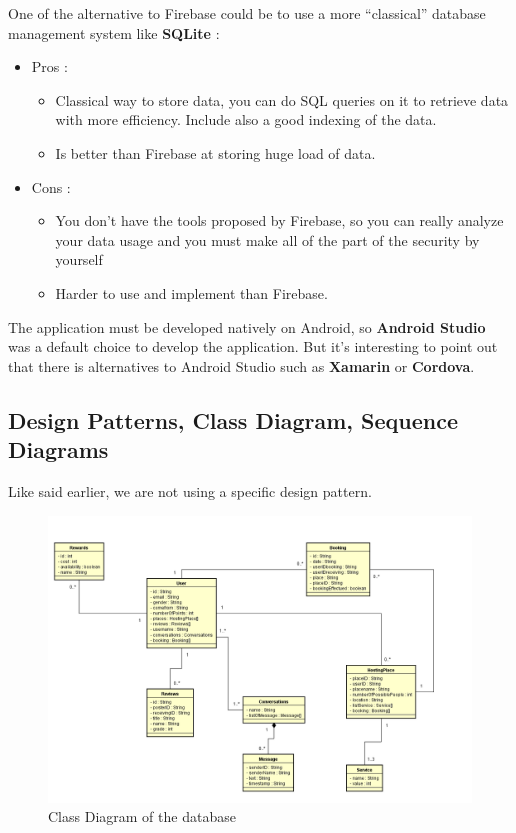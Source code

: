 \documentclass[paper=a4, fontsize=12pt,DIV=14]{scrartcl}    %
\begin{document}
One of the alternative to Firebase could be to use a more “classical” database management system like \textbf{SQLite} :
\begin{itemize}
\item Pros :
	\begin{itemize}
		\item	Classical way to store data, you can do SQL queries on it to retrieve data with more efficiency. Include also a good indexing of the data.
		\item	Is better than Firebase at storing huge load of data.
	\end{itemize}
\item Cons :
	\begin{itemize}
\item	You don’t have the tools proposed by Firebase, so you can really analyze your data usage and you must make all of the part of the security by yourself
\item	Harder to use and implement than Firebase.
	\end{itemize}
\end{itemize}

The application must be developed natively on Android, so \textbf{Android Studio} was a default choice to develop the application. But it's interesting to point out that there is alternatives to Android Studio such as \textbf{Xamarin} or \textbf{Cordova}.\\
\subsection{Design Patterns, Class Diagram, Sequence Diagrams}

Like said earlier, we are not using a specific design pattern.

\begin{figure}[!htbp]
							\center
		                    \includegraphics[scale=0.6]{img/class_diagram.png}
		                    \caption{Class Diagram of the database } 
\end{figure}
\end{document}
